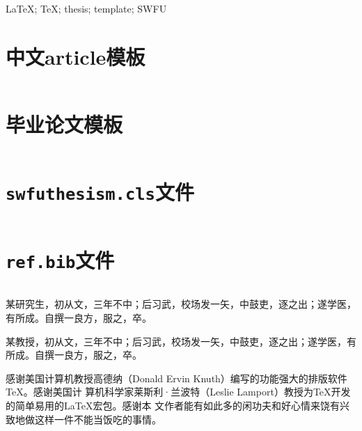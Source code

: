 \documentclass{swfuthesism}
\begin{document}
\begin{ekeyword}
  \LaTeX{}; \TeX{}; thesis; template; SWFU
\end{ekeyword}

\frontmatter          
\tableofcontents     %
\cleardoublepage %

\mainmatter{}






\appendix %

\makebib %

\singlespacing





\chapter{中文article模板}
\label{app:article}

\inputminted{latex}{article.tex}

\chapter{毕业论文模板}
\label{app:thesis}

\inputminted{latex}{thesis-template.tex}

\chapter{\texttt{swfuthesism.cls}文件}
\label{app:class}

\inputminted{latex}{swfuthesism.cls}

\chapter{\texttt{ref.bib}文件}
\label{app:bib}

\inputminted{bibtex}{ref.bib}


\doublespacing

\begin{authorInfo}
  某研究生，初从文，三年不中；后习武，校场发一矢，中鼓吏，逐之出；遂学医，有所成。自撰一良方，服之，卒。
\end{authorInfo}

\begin{advisorInfo}
  某教授，初从文，三年不中；后习武，校场发一矢，中鼓吏，逐之出；遂学医，有所成。自撰一良方，服之，卒。
\end{advisorInfo}


\begin{acknowledgment}
  感谢美国计算机教授高德纳（Donald Ervin Knuth）编写的功能强大的排版软件\TeX{}。感谢美国计
  算机科学家莱斯利·兰波特（Leslie Lamport）教授为\TeX{}开发的简单易用的\LaTeX{}宏包。感谢本
  文作者能有如此多的闲功夫和好心情来饶有兴致地做这样一件不能当饭吃的事情。
\end{acknowledgment}
\end{document}
